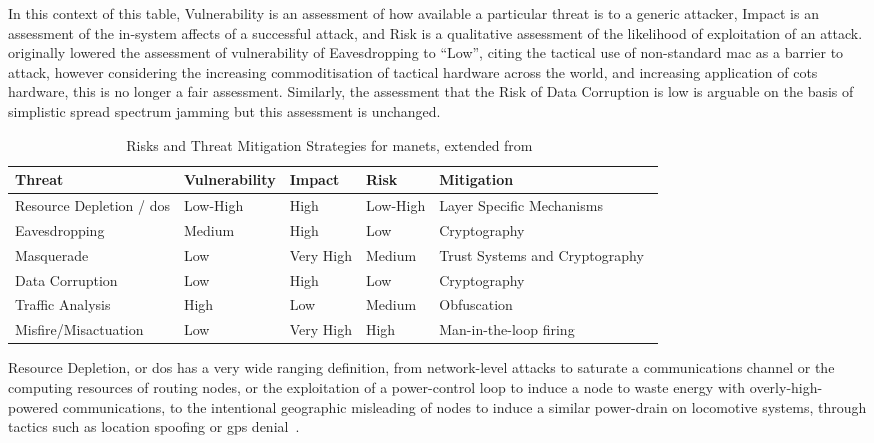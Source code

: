 In this context of this table, Vulnerability is an assessment of how available a particular threat is to a generic attacker, Impact is an assessment of the in-system affects of a successful attack, and Risk is a qualitative assessment of the likelihood of exploitation of an attack.
\citet{Kidston2010} originally lowered the assessment of vulnerability of Eavesdropping to ``Low'', citing the tactical use of non-standard \gls{mac} as a barrier to attack, however considering the increasing commoditisation of tactical hardware across the world, and increasing application of \gls{cots} hardware, this is no longer a fair assessment.
Similarly, the assessment that the Risk of Data Corruption is low is arguable on the basis of simplistic spread spectrum jamming but this assessment is unchanged.

\begin{table}
	\caption[Risks and Threat Mitigation Strategies for MANETs]{Risks and Threat Mitigation Strategies for \glspl{manet}, extended from~\citet{Kidston2010}}
	\label{tab:manet_risk}
	\begin{tabularx}{\textwidth}{p{3cm} X X X >{\raggedright\arraybackslash}p{4cm}}\toprule
		Threat & Vulnerability & Impact & Risk & Mitigation	\\\midrule
		Resource Depletion / \gls{dos} & Low-High & High & Low-High & Layer Specific Mechanisms~\cite{Wu2007,Nwaocha2015}\\
		Eavesdropping & Medium & High & Low & Cryptography~\cite{Chen2010}\\
		Masquerade & Low & Very High & Medium & Trust Systems and Cryptography~\cite{Wang2009a}\\
		Data Corruption & Low & High & Low & Cryptography\\
		Traffic Analysis & High & Low & Medium & Obfuscation~\cite{Huang2010}\\
		Misfire/Misactuation & Low & Very High & High & Man-in-the-loop firing~\cite{Caseley2009}\\
	\end{tabularx}
\end{table}

Resource Depletion, or \gls{dos} has a very wide ranging definition, from network-level attacks to saturate a communications channel or the computing resources of routing nodes, or the exploitation of a power-control loop to induce a node to waste energy with overly-high-powered communications, to the intentional geographic misleading of nodes to induce a similar power-drain on locomotive systems, through tactics such as location spoofing or \gls{gps} denial~\cite{Zuba2015}.

